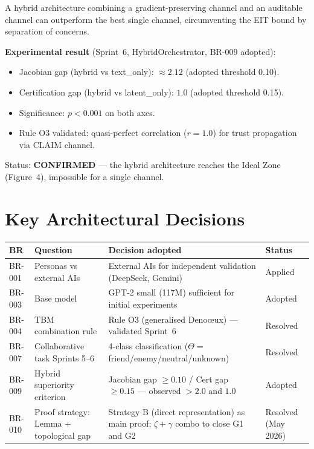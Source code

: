 \documentclass[11pt,a4paper]{article}
\theoremstyle{plain}
\begin{document}
A hybrid architecture combining a gradient-preserving channel and an auditable
channel can outperform the best single channel, circumventing the EIT bound by
separation of concerns.

\begin{validated}
\textbf{Experimental result} (Sprint~6, HybridOrchestrator, BR-009 adopted):
\begin{itemize}[noitemsep]
\item Jacobian gap (hybrid vs text\_only): $\approx 2.12$ (adopted threshold 0.10).
\item Certification gap (hybrid vs latent\_only): $1.0$ (adopted threshold 0.15).
\item Significance: $p < 0.001$ on both axes.
\item Rule O3 validated: quasi-perfect correlation ($r = 1.0$) for trust propagation via CLAIM channel.
\end{itemize}
Status: \textbf{CONFIRMED} --- the hybrid architecture reaches the Ideal Zone (Figure~4), impossible for a single channel.
\end{validated}

\section{Key Architectural Decisions}

\begin{longtable}{p{1cm}p{5cm}p{6cm}p{1.5cm}}
\toprule
BR & Question & Decision adopted & Status \\
\midrule
BR-001 & Personas vs external AIs & External AIs for independent validation (DeepSeek, Gemini) & Applied \\
BR-003 & Base model & GPT-2 small (117M) sufficient for initial experiments & Adopted \\
BR-004 & TBM combination rule & Rule O3 (generalised Deno\oe{}ux) --- validated Sprint~6 & Resolved \\
BR-007 & Collaborative task Sprints 5--6 & 4-class classification ($\Theta = $ friend/enemy/neutral/unknown) & Resolved \\
BR-009 & Hybrid superiority criterion & Jacobian gap $\ge 0.10$ / Cert gap $\ge 0.15$ --- observed $> 2.0$ and $1.0$ & Adopted \\
BR-010 & Proof strategy: Lemma + topological gap & Strategy B (direct representation) as main proof; $\zeta + \gamma$ combo to close G1 and G2 & Resolved (May 2026) \\
\bottomrule
\end{longtable}
\end{document}
